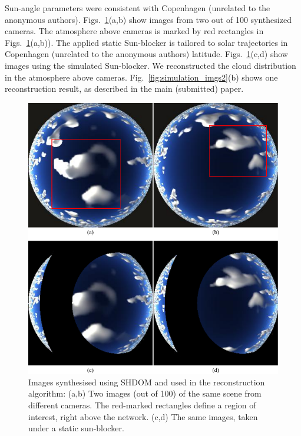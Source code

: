 \documentclass[runningheads]{llncs}
\begin{document}
Sun-angle parameters were consistent with Copenhagen (unrelated to the anonymous authors). Figs.~\ref{fig:simulation_imgs1}(a,b) show images from two out of 100
synthesized cameras. The atmosphere above cameras is marked by red rectangles in Figs.~\ref{fig:simulation_imgs1}(a,b)). The applied static Sun-blocker is tailored to solar trajectories in Copenhagen (unrelated to the anonymous authors) latitude. Figs.~\ref{fig:simulation_imgs1}(c,d) show images using the simulated Sun-blocker.
We reconstructed the cloud distribution in the atmosphere above cameras. Fig.~\ref{fig:simulation_imgs2}(b) shows one reconstruction result, as described in the main (submitted) paper.
\begin{figure}
  \begin{center}
    \includegraphics{figures/simulation_imgs}
    \caption{Images synthesised using SHDOM and used in the
      reconstruction algorithm: (a,b) Two images (out of 100) of the
      same scene from different cameras. The red-marked rectangles define
      a region of interest, right above the network. (c,d) The
      same images, taken under a static sun-blocker.}
    \label{fig:simulation_imgs1}
  \end{center}
\end{figure}
\end{document}
